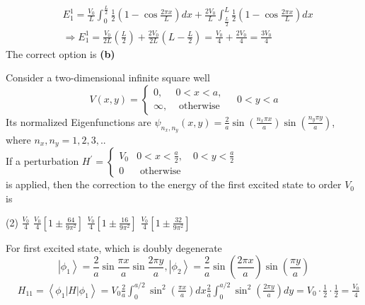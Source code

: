 \begin{enumerate}
\begin{answer}
$$\begin{aligned}
	&E_{1}^{1}=\frac{V_{0}}{L} \int_{0}^{\frac{L}{2}} \frac{1}{2}\left(1-\cos \frac{2 \pi x}{L}\right) d x+\frac{2 V_{0}}{L} \int_{\frac{L}{2}}^{L} \frac{1}{2}\left(1-\cos \frac{2 \pi x}{L}\right) d x \\
	&\Rightarrow E_{1}^{1}=\frac{V_{0}}{2 L}\left(\frac{L}{2}\right)+\frac{2 V_{0}}{2 L}\left(L-\frac{L}{2}\right)=\frac{V_{0}}{4}+\frac{2 V_{0}}{4}=\frac{3 V_{0}}{4}
	\end{aligned}$$
	The correct option is \textbf{(b)}	
\end{answer}
\begin{minipage}{\textwidth}
	\item Consider a two-dimensional infinite square well
	$$
	V(x, y)=\left\{\begin{array}{ll}
	0, & 0<x<a, \\
	\infty, & \text { otherwise }
	\end{array} \quad 0<y<a\right.
	$$
	Its normalized Eigenfunctions are $\psi_{n_{x}, n_{y}}(x, y)=\frac{2}{a} \sin \left(\frac{n_{x} \pi x}{a}\right) \sin \left(\frac{n_{y} \pi y}{a}\right)$,
	where $n_{x}, n_{y}=1,2,3, . .$\\
	If a perturbation $H^{\prime}=\left\{\begin{array}{cc}V_{0} & 0<x<\frac{a}{2}, \quad 0<y<\frac{a}{2} \\ 0 & \text { otherwise }\end{array}\right.$ \\is applied, then the correction to the
	energy of the first excited state to order $V_{0}$ is
\end{minipage}
\begin{tasks}(2)
	\task[\textbf{A.}] $\frac{V_{0}}{4}$
	\task[\textbf{B.}]$\frac{V_{0}}{4}\left[1 \pm \frac{64}{9 \pi^{2}}\right]$
	\task[\textbf{C.}]$\frac{V_{0}}{4}\left[1 \pm \frac{16}{9 \pi^{2}}\right]$
	\task[\textbf{D.}]$\frac{V_{0}}{4}\left[1 \pm \frac{32}{9 \pi^{2}}\right]$
\end{tasks}
\begin{answer}
	For first excited state, which is doubly degenerate
	$$
	\left|\phi_{1}\right\rangle=\frac{2}{a} \sin \frac{\pi x}{a} \sin \frac{2 \pi y}{a},\left|\phi_{2}\right\rangle=\frac{2}{a} \sin \left(\frac{2 \pi x}{a}\right) \sin \left(\frac{\pi y}{a}\right)
	$$
	$$\begin{aligned}
	&H_{11}=\left\langle\phi_{1}|H| \phi_{1}\right\rangle=V_{0} \frac{2}{a} \int_{0}^{a / 2} \sin ^{2}\left(\frac{\pi x}{a}\right) d x \frac{2}{a} \int_{0}^{a / 2} \sin ^{2}\left(\frac{2 \pi y}{a}\right) d y=V_{0} \cdot \frac{1}{2} \cdot \frac{1}{2}=\frac{V_{0}}{4} \\

\end{aligned}$$
\end{answer}
\end{enumerate}
